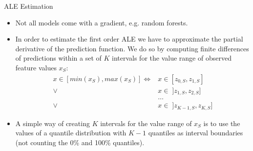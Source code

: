 \documentclass[aspectratio=169]{../latex_main/tntbeamer}  %
\begin{document}

\begin{frame}{ALE Estimation}

\begin{itemize}
  \item Not all models come with a gradient, e.g. random forests.
  \item In order to estimate the first order ALE we have to approximate the partial derivative of the prediction function. We do so by computing finite differences of predictions within a set of $K$ intervals for the value range of observed feature values $x_S$:
  $$
  \begin{aligned}
  x \in [min(x_S), max(x_S)] \iff &x \in [z_{0, S}, z_{1, S}] \\
  \lor &x \in \; ]z_{1, S}, z_{2, S}] \\
  &\dots \\
  \lor &x \in \; ]z_{K-1, S}, z_{K, S}]
  \end{aligned}
  $$
  \pause
  \item A simple way of creating $K$ intervals for the value range of $x_S$ is to use the values of a quantile distribution with $K-1$ quantiles as interval boundaries\\ (not counting the 0\% and 100\% quantiles).
\end{itemize}

\end{frame}
\end{document}
